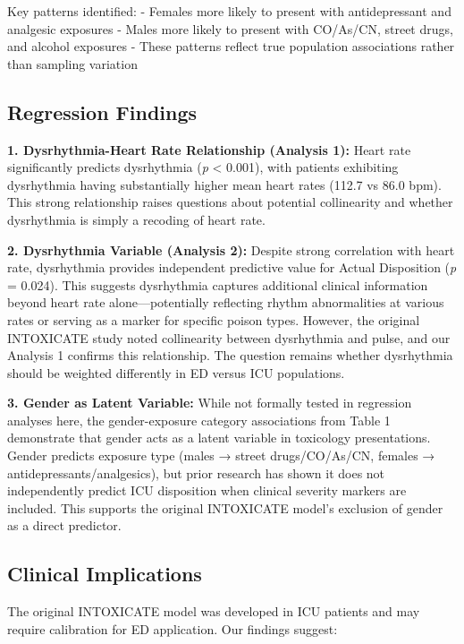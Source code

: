 \documentclass[
]{article}
\begin{document}
Key patterns identified:
- Females more likely to present with antidepressant and analgesic exposures
- Males more likely to present with CO/As/CN, street drugs, and alcohol exposures
- These patterns reflect true population associations rather than sampling variation

\subsection{Regression Findings}\label{regression-findings}

\textbf{1. Dysrhythmia-Heart Rate Relationship (Analysis 1):} Heart rate significantly predicts dysrhythmia (\emph{p} \textless{} 0.001), with patients exhibiting dysrhythmia having substantially higher mean heart rates (112.7 vs 86.0 bpm). This strong relationship raises questions about potential collinearity and whether dysrhythmia is simply a recoding of heart rate.

\textbf{2. Dysrhythmia Variable (Analysis 2):} Despite strong correlation with heart rate, dysrhythmia provides independent predictive value for Actual Disposition (\emph{p} = 0.024). This suggests dysrhythmia captures additional clinical information beyond heart rate alone---potentially reflecting rhythm abnormalities at various rates or serving as a marker for specific poison types. However, the original INTOXICATE study noted collinearity between dysrhythmia and pulse, and our Analysis 1 confirms this relationship. The question remains whether dysrhythmia should be weighted differently in ED versus ICU populations.

\textbf{3. Gender as Latent Variable:} While not formally tested in regression analyses here, the gender-exposure category associations from Table 1 demonstrate that gender acts as a latent variable in toxicology presentations. Gender predicts exposure type (males → street drugs/CO/As/CN, females → antidepressants/analgesics), but prior research has shown it does not independently predict ICU disposition when clinical severity markers are included. This supports the original INTOXICATE model's exclusion of gender as a direct predictor.

\subsection{Clinical Implications}\label{clinical-implications}

The original INTOXICATE model was developed in ICU patients and may require calibration for ED application. Our findings suggest:
\end{document}
